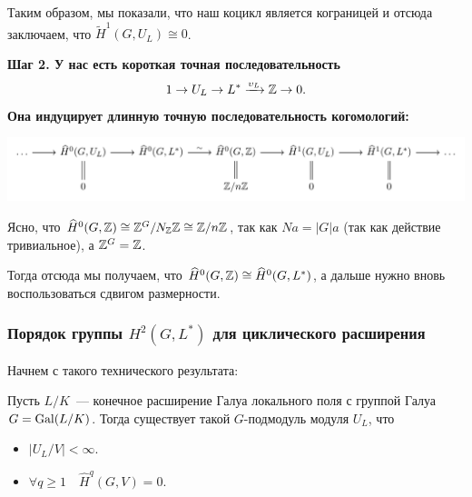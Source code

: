 	  Таким образом, мы показали, что наш коцикл является кограницей и отсюда заключаем, что $\widetilde{H}^1(G, U_L) \cong 0$.

	  \noindent\bf{Шаг 2.} У нас есть короткая точная последовательность 
	  \[
	  	1 \to U_L \to L^* \xrightarrow{\upsilon_L} \mathbb{Z} \to 0.
	  \]
	  Она индуцирует длинную точную последовательность когомологий: 

	  \begin{center}
	  	\includegraphics{lectures/6/pictures/cd_25.pdf}
	  \end{center}

	  Ясно, что $\widehat{H}^0(G, \mathbb{Z}) \cong \mathbb{Z}^{G}/ N_{\mathbb{Z}} \mathbb{Z} \cong \mathbb{Z}/n\mathbb{Z}$, так как $N a = |G| a$ (так как действие тривиальное), а $\mathbb{Z}^{G} = \mathbb{Z}$. 

	  Тогда отсюда мы получаем, что $\widehat{H}^{0}(G, \mathbb{Z}) \cong \widehat{H}^0(G, L^*)$, а дальше нужно вновь воспользоваться сдвигом размерности. 

	  \subsubsection{Порядок группы $H^{2}(G, L^*)$ для циклического расширения}

	  Начнем с такого технического результата: 

	  \begin{statement} 
	  	Пусть $L/K$~--- конечное расширение Галуа локального поля с группой Галуа $G = \operatorname{Gal}(L/K)$. Тогда существует такой $G$-подмодуль модуля $U_L$, что 
	  	\begin{itemize}
	  		\item $|U_L/V| < \infty$.
	  		\item $\forall q \ge 1 \quad \widehat{H}^q(G, V) = 0$.
	  	\end{itemize}
	  \end{statement}

